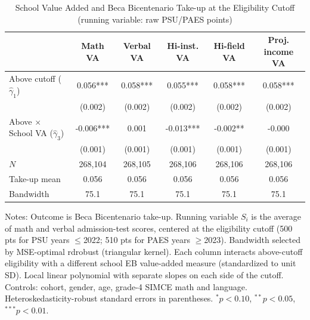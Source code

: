 \begin{table}[!htbp]
\centering
\caption{School Value Added and Beca Bicentenario Take-up at the Eligibility Cutoff (running variable: raw PSU/PAES points)}
\label{tab:bicentenario-rd-va-interaction-pts}
\begin{tabular}{lccccc}
\toprule
 & Math VA & Verbal VA & Hi-inst. VA & Hi-field VA & Proj. income VA \\
\midrule
Above cutoff ($\hat{\gamma}_1$) & 0.056*** & 0.058*** & 0.055*** & 0.058*** & 0.058*** \\
        & (0.002) & (0.002) & (0.002) & (0.002) & (0.002) \\
Above $\times$ School VA ($\hat{\gamma}_3$) & -0.006*** & 0.001 & -0.013*** & -0.002** & -0.000 \\
        & (0.001) & (0.001) & (0.001) & (0.001) & (0.001) \\
\midrule
$N$ & 268,104 & 268,105 & 268,106 & 268,106 & 268,106 \\
Take-up mean & 0.056 & 0.056 & 0.056 & 0.056 & 0.056 \\
Bandwidth & 75.1 & 75.1 & 75.1 & 75.1 & 75.1 \\
\bottomrule
\end{tabular}
\par\medskip\footnotesize
\begin{minipage}{\textwidth}
Notes: Outcome is Beca Bicentenario take-up. Running variable $S_i$ is the average of math and verbal admission-test scores, centered at the eligibility cutoff (500 pts for PSU years $\leq$2022; 510 pts for PAES years $\geq$2023). Bandwidth selected by MSE-optimal rdrobust (triangular kernel). Each column interacts above-cutoff eligibility with a different school EB value-added measure (standardized to unit SD). Local linear polynomial with separate slopes on each side of the cutoff. Controls: cohort, gender, age, grade-4 SIMCE math and language. Heteroskedasticity-robust standard errors in parentheses. $^{*}p<0.10$, $^{**}p<0.05$, $^{***}p<0.01$.
\end{minipage}
\end{table}
